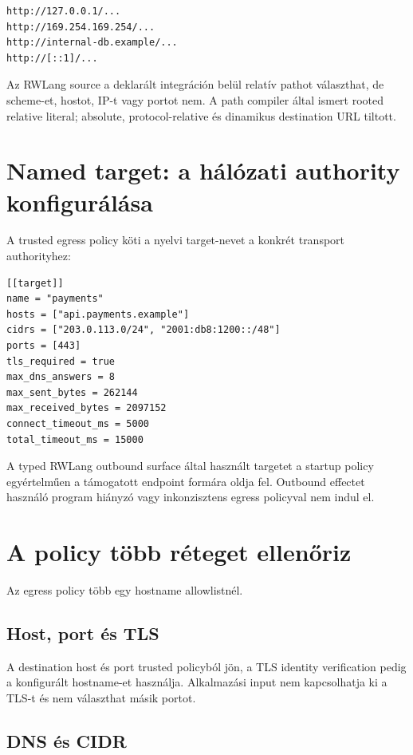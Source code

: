 \begin{lstlisting}
http://127.0.0.1/...
http://169.254.169.254/...
http://internal-db.example/...
http://[::1]/...
\end{lstlisting}

Az RWLang source a deklarált integráción belül relatív pathot választhat, de scheme-et, hostot, IP-t vagy portot nem. A path compiler által ismert rooted relative literal; absolute, protocol-relative és dinamikus destination URL tiltott.

\section{Named target: a hálózati authority konfigurálása}

A trusted egress policy köti a nyelvi target-nevet a konkrét transport authorityhez:

\begin{lstlisting}
[[target]]
name = "payments"
hosts = ["api.payments.example"]
cidrs = ["203.0.113.0/24", "2001:db8:1200::/48"]
ports = [443]
tls_required = true
max_dns_answers = 8
max_sent_bytes = 262144
max_received_bytes = 2097152
connect_timeout_ms = 5000
total_timeout_ms = 15000
\end{lstlisting}

A typed RWLang outbound surface által használt targetet a startup policy egyértelműen a támogatott endpoint formára oldja fel. Outbound effectet használó program hiányzó vagy inkonzisztens egress policyval nem indul el.

\section{A policy több réteget ellenőriz}

Az egress policy több egy hostname allowlistnél.

\subsection*{Host, port és TLS}

A destination host és port trusted policyból jön, a TLS identity verification pedig a konfigurált hostname-et használja. Alkalmazási input nem kapcsolhatja ki a TLS-t és nem választhat másik portot.

\subsection*{DNS és CIDR}

